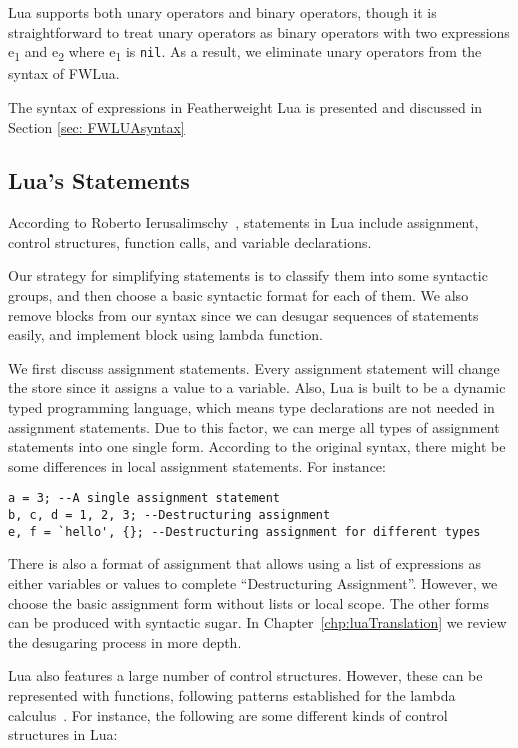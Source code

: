 Lua supports both
unary operators and binary operators, though it is straightforward to treat unary operators as binary operators
with two expressions e\textsubscript{1} and e\textsubscript{2} where e\textsubscript{1} is {\tt nil}.
As a result, we eliminate unary operators from the syntax of FWLua.

The syntax of expressions in Featherweight Lua is presented and discussed in Section \ref{sec: FWLUAsyntax}

\subsection{Lua's Statements}
According to Roberto Ierusalimschy~\cite{PIL},
statements in Lua include assignment, control structures, function calls, and variable declarations.

Our strategy for simplifying statements is to classify them into some syntactic groups, and then choose a basic syntactic format for each of them.
We also remove blocks from our syntax since we can desugar sequences of statements easily, and implement block using lambda function.

We first discuss assignment statements. Every assignment statement will change the store since it assigns a value to a variable. Also, Lua is built to be a dynamic typed programming language, which means type declarations are not needed in assignment statements. Due to this factor, we can merge all types of assignment statements into one single form. According to the original syntax, there might be some differences in local assignment statements. For instance:

\begin{verbatim}
a = 3; --A single assignment statement
b, c, d = 1, 2, 3; --Destructuring assignment
e, f = `hello', {}; --Destructuring assignment for different types
\end{verbatim}

There is also a format of assignment that allows using a list of expressions as either variables or values to complete ``Destructuring Assignment''. However, we choose the basic assignment form without lists or local scope. The other forms can be produced with syntactic sugar.
In Chapter~\ref{chp:luaTranslation} we review the desugaring process in more depth.

Lua also features a large number of control structures. However, these can be represented with functions, following patterns established for the lambda calculus~\cite{TAPL}. For instance, the following are some different kinds of control structures in Lua:

